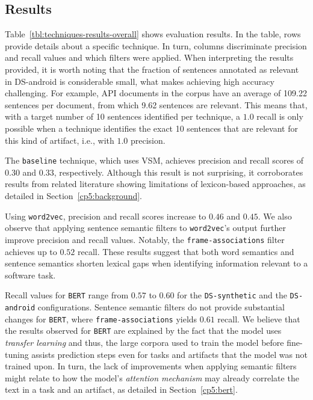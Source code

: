\subsection{Results}


Table~\ref{tbl:techniques-results-overall} shows evaluation results. 
In the table, rows provide details about a specific technique. In turn, columns discriminate 
precision and recall values and which filters were applied. 
When interpreting the results provided, it is worth noting that the fraction of sentences annotated as relevant
in \acs{DS-android} is considerable small, what makes achieving high accuracy challenging. 
For example, API documents in the corpus have an average of 109.22 sentences per document, from which 9.62 sentences are relevant. 
This means that, with a target number of 10 sentences identified per technique, a $1.0$ recall is only possible when a technique identifies the exact 10 sentences that are relevant for this kind of artifact, i.e.,  with $1.0$ precision.







The \texttt{baseline} technique, which uses VSM, achieves precision and recall scores of $0.30$ and $0.33$, respectively. 
Although this result is not surprising, it corroborates results from related literature showing limitations of lexicon-based approaches, as detailed in Section~\ref{cp5:background}.





Using \texttt{word2vec}, precision and recall scores increase to $0.46$ and $0.45$. We also observe that applying sentence semantic filters to \texttt{word2vec}'s output further improve precision and recall values. Notably, the 
\texttt{frame-associations} filter achieves up to $0.52$ recall. These results suggest that both word semantics and sentence
semantics shorten lexical gaps when identifying information relevant to a software task.


Recall values for 
\texttt{BERT} range from $0.57$ to $0.60$ for 
the \texttt{DS-synthetic} and the \texttt{DS-android} configurations.
Sentence semantic filters do not provide substantial changes for \texttt{BERT}, where \texttt{frame-associations} yields $0.61$ recall. We believe that the 
results observed for \texttt{BERT} are explained by 
the fact that the model uses \textit{transfer learning} and thus, the  
large corpora used to train the model before fine-tuning assists prediction steps even for tasks and artifacts that the model was not trained upon. In turn, the lack of improvements when applying  semantic filters might relate to how the model's \textit{attention mechanism} may already correlate the text in a task and an artifact, as detailed in Section~\ref{cp5:bert}.





